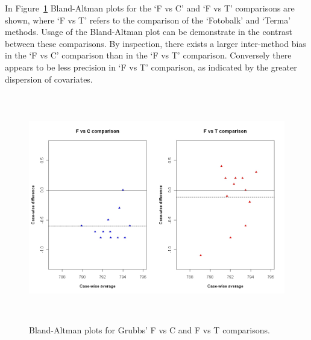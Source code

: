 \documentclass[12pt, a4paper]{report}
\theoremstyle{plain}
\theoremstyle{definition}
\theoremstyle{remark}
\begin{document}
In Figure~\ref{GrubbsDataTwoBAplots} Bland-Altman plots for the `F vs C' and `F vs T'
	comparisons are shown, where `F vs T' refers to the comparison of
	the `Fotobalk' and `Terma' methods. Usage of the Bland-Altman plot
	can be demonstrate in the contrast between these comparisons. By inspection, there exists a larger inter-method bias in the `F vs C' comparison than in the `F vs T' comparison. Conversely there appears to be less precision in `F vs T' comparison, as indicated by the greater dispersion of covariates.
	
	\begin{figure}[h!]
		\begin{center}
			\includegraphics[height=100mm]{images/GrubbsDataTwoBAplots.jpeg}
			\caption{Bland-Altman plots for Grubbs' F vs C and F vs T comparisons.}\label{GrubbsDataTwoBAplots}
		\end{center}
	\end{figure}
	

	
	
	
	
	
	
	
	
\end{document}

